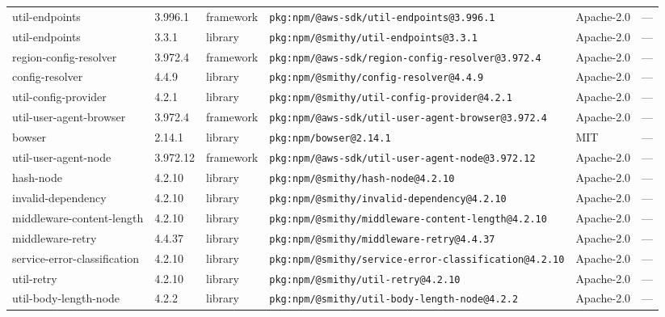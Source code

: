 \documentclass[11pt,a4paper]{article}
\begin{document}
\begin{longtable}{|p{4cm}|p{2cm}|p{1.6cm}|p{5cm}|p{1.5cm}|p{3.5cm}|}
\raggedright util-endpoints & 3.996.1 & framework & \small\texttt{pkg:npm/@aws-sdk/util-endpoints@3.996.1} & Apache-2.0 & \small — \\
\raggedright util-endpoints & 3.3.1 & library & \small\texttt{pkg:npm/@smithy/util-endpoints@3.3.1} & Apache-2.0 & \small — \\
\raggedright region-config-resolver & 3.972.4 & framework & \small\texttt{pkg:npm/@aws-sdk/region-config-resolver@3.972.4} & Apache-2.0 & \small — \\
\raggedright config-resolver & 4.4.9 & library & \small\texttt{pkg:npm/@smithy/config-resolver@4.4.9} & Apache-2.0 & \small — \\
\raggedright util-config-provider & 4.2.1 & library & \small\texttt{pkg:npm/@smithy/util-config-provider@4.2.1} & Apache-2.0 & \small — \\
\raggedright util-user-agent-browser & 3.972.4 & framework & \small\texttt{pkg:npm/@aws-sdk/util-user-agent-browser@3.972.4} & Apache-2.0 & \small — \\
\raggedright bowser & 2.14.1 & library & \small\texttt{pkg:npm/bowser@2.14.1} & MIT & \small — \\
\raggedright util-user-agent-node & 3.972.12 & framework & \small\texttt{pkg:npm/@aws-sdk/util-user-agent-node@3.972.12} & Apache-2.0 & \small — \\
\raggedright hash-node & 4.2.10 & library & \small\texttt{pkg:npm/@smithy/hash-node@4.2.10} & Apache-2.0 & \small — \\
\raggedright invalid-dependency & 4.2.10 & library & \small\texttt{pkg:npm/@smithy/invalid-dependency@4.2.10} & Apache-2.0 & \small — \\
\raggedright middleware-content-length & 4.2.10 & library & \small\texttt{pkg:npm/@smithy/middleware-content-length@4.2.10} & Apache-2.0 & \small — \\
\raggedright middleware-retry & 4.4.37 & library & \small\texttt{pkg:npm/@smithy/middleware-retry@4.4.37} & Apache-2.0 & \small — \\
\raggedright service-error-classification & 4.2.10 & library & \small\texttt{pkg:npm/@smithy/service-error-classification@4.2.10} & Apache-2.0 & \small — \\
\raggedright util-retry & 4.2.10 & library & \small\texttt{pkg:npm/@smithy/util-retry@4.2.10} & Apache-2.0 & \small — \\
\raggedright util-body-length-node & 4.2.2 & library & \small\texttt{pkg:npm/@smithy/util-body-length-node@4.2.2} & Apache-2.0 & \small — \\

\end{longtable}
\end{document}
